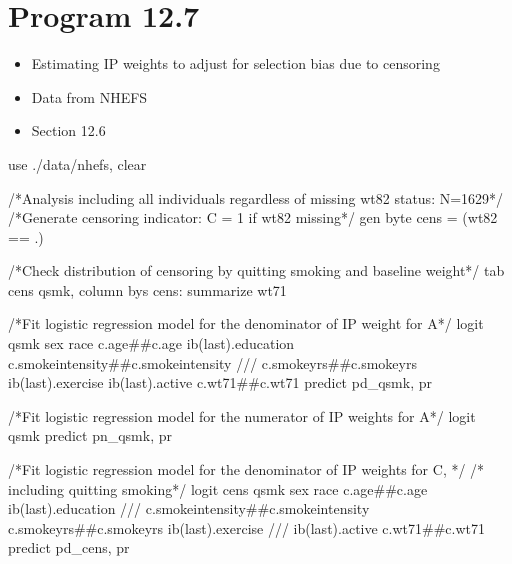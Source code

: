 \documentclass[
  10pt,
  a4paper,
]{book}
\newenvironment{Shaded}{\begin{snugshade}}{\end{snugshade}}
\newcommand{\CommentTok}[1]{\textcolor[rgb]{0.37,0.37,0.37}{#1}}
\newcommand{\FunctionTok}[1]{\textcolor[rgb]{0.28,0.35,0.67}{#1}}
\newcommand{\KeywordTok}[1]{\textcolor[rgb]{0.00,0.46,0.62}{#1}}
\newcommand{\NormalTok}[1]{\textcolor[rgb]{0.00,0.46,0.62}{#1}}
\providecommand{\tightlist}{%
  \setlength{\itemsep}{0pt}\setlength{\parskip}{0pt}}
\begin{document}
\section{Program 12.7}\label{program-12.7-1}

\begin{itemize}
\tightlist
\item
  Estimating IP weights to adjust for selection bias due to censoring
\item
  Data from NHEFS
\item
  Section 12.6
\end{itemize}

\begin{Shaded}
\begin{Highlighting}[]
\KeywordTok{use}\NormalTok{ ./}\KeywordTok{data}\NormalTok{/nhefs, }\KeywordTok{clear}

\CommentTok{/*Analysis including all individuals regardless of missing wt82 status: N=1629*/}
\CommentTok{/*Generate censoring indicator: C = 1 if wt82 missing*/}
\KeywordTok{gen} \KeywordTok{byte}\NormalTok{ cens = (wt82 == .)}

\CommentTok{/*Check distribution of censoring by quitting smoking and baseline weight*/}
\KeywordTok{tab}\NormalTok{ cens qsmk, column}
\KeywordTok{bys}\NormalTok{ cens: }\KeywordTok{summarize}\NormalTok{ wt71}

\CommentTok{/*Fit logistic regression model for the  denominator of IP weight for A*/}
\KeywordTok{logit}\NormalTok{ qsmk sex race c.age\#\#c.age ib(}\FunctionTok{last}\NormalTok{).education c.smokeintensity\#\#c.smokeintensity }\CommentTok{///}
\NormalTok{c.smokeyrs\#\#c.smokeyrs ib(}\FunctionTok{last}\NormalTok{).exercise ib(}\FunctionTok{last}\NormalTok{).active c.wt71\#\#c.wt71 }
\KeywordTok{predict}\NormalTok{ pd\_qsmk, pr}

\CommentTok{/*Fit logistic regression model for the numerator of IP weights for A*/}
\KeywordTok{logit}\NormalTok{ qsmk}
\KeywordTok{predict}\NormalTok{ pn\_qsmk, pr}

\CommentTok{/*Fit logistic regression model for the denominator of IP weights for C, */}
\CommentTok{/* including quitting smoking*/}
\KeywordTok{logit}\NormalTok{ cens qsmk sex race c.age\#\#c.age ib(}\FunctionTok{last}\NormalTok{).education }\CommentTok{///}
\NormalTok{c.smokeintensity\#\#c.smokeintensity c.smokeyrs\#\#c.smokeyrs ib(}\FunctionTok{last}\NormalTok{).exercise }\CommentTok{///}
\NormalTok{ib(}\FunctionTok{last}\NormalTok{).active c.wt71\#\#c.wt71 }
\KeywordTok{predict}\NormalTok{ pd\_cens, pr}


\end{Highlighting}
\end{Shaded}
\end{document}
